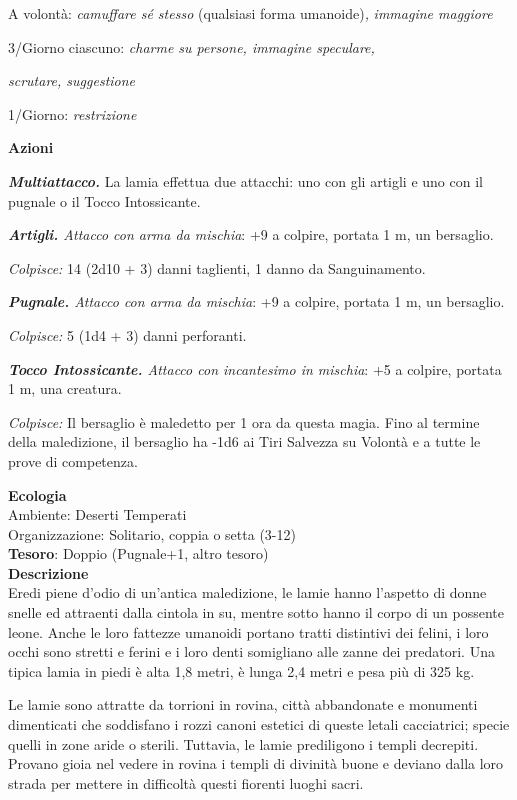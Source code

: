 \begin{multicols}{2}
	A volontà: \textit{camuffare sé stesso} (qualsiasi forma umanoide)\textit{,} \textit{immagine maggiore}

	3/Giorno ciascuno: \textit{charme su persone, immagine speculare,}

	\textit{scrutare, suggestione}

	1/Giorno: \textit{restrizione}

	\textbf{Azioni}

	\textit{\textbf{Multiattacco.}} La lamia effettua due attacchi: uno con gli artigli e uno con il pugnale o il Tocco Intossicante.

	\textit{\textbf{Artigli.} Attacco con arma da mischia}: +9 a colpire, portata 1 m, un bersaglio.

	\textit{Colpisce:} 14 (2d10 + 3) danni taglienti, 1 danno da Sanguinamento.

	\textit{\textbf{Pugnale.} Attacco con arma da mischia}: +9 a colpire, portata 1 m, un bersaglio.

	\textit{Colpisce:} 5 (1d4 + 3) danni perforanti.

	\textit{\textbf{Tocco Intossicante.} Attacco con incantesimo in mischia}: +5 a colpire, portata 1 m, una creatura.

	\textit{Colpisce:} Il bersaglio è maledetto per 1 ora da questa magia. Fino al termine della maledizione, il bersaglio ha -1d6 ai Tiri Salvezza su Volontà e a tutte le prove di competenza.

	\textbf{Ecologia}\\
	Ambiente: Deserti Temperati\\
	Organizzazione: Solitario, coppia o setta (3-12)\\
	\textbf{Tesoro}: Doppio (Pugnale+1, altro tesoro)\\

	\textbf{Descrizione}\\
	Eredi piene d'odio di un'antica maledizione, le lamie hanno l'aspetto di donne snelle ed attraenti dalla cintola in su, mentre sotto hanno il corpo di un possente leone. Anche le loro fattezze umanoidi portano tratti distintivi dei felini, i loro occhi sono stretti e ferini e i loro denti somigliano alle zanne dei predatori. Una tipica lamia in piedi è alta 1,8 metri, è lunga 2,4 metri e pesa più di 325 kg.

	Le lamie sono attratte da torrioni in rovina, città abbandonate e monumenti dimenticati che soddisfano i rozzi canoni estetici di queste letali cacciatrici; specie quelli in zone aride o sterili. Tuttavia, le lamie prediligono i templi decrepiti. Provano gioia nel vedere in rovina i templi di divinità buone e deviano dalla loro strada per mettere in difficoltà questi fiorenti luoghi sacri.


\end{multicols}

